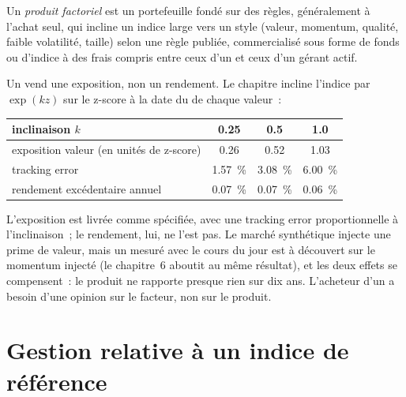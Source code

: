 \begin{definition}\label{def:s1:the-asset-managers-strategies:factor}
Un \emph{produit factoriel} est un portefeuille fondé sur des règles, généralement à l'achat seul, qui incline un indice large vers un style (valeur, momentum,
qualité, faible volatilité, taille) selon une règle publiée, commercialisé sous forme de fonds ou d'indice à des frais compris entre ceux d'un  et ceux d'un gérant actif.
\end{definition}

Un  vend une exposition, non un rendement. Le chapitre incline l'indice par $\exp(kz)$ sur le z-score à la date du  de chaque valeur~:

\begin{center}
\small
\begin{tabular}{@{}lccc@{}}
\toprule
inclinaison $k$ & 0.25 & 0.5 & 1.0\\
\midrule
exposition valeur (en unités de z-score) & 0.26 & 0.52 & 1.03\\
tracking error & 1.57~\% & 3.08~\% & 6.00~\%\\
rendement excédentaire annuel & 0.07~\% & 0.07~\% & 0.06~\%\\
\bottomrule
\end{tabular}
\end{center}

L'exposition est livrée comme spécifiée, avec une tracking error proportionnelle à l'inclinaison~; le rendement, lui, ne l'est pas. Le marché synthétique injecte une prime de valeur,
mais un  mesuré avec le cours du jour est à découvert sur le momentum injecté (le chapitre~6 aboutit au même résultat), et les deux effets se compensent~: le produit ne rapporte presque
rien sur dix ans. L'acheteur d'un  a besoin d'une opinion sur le facteur, non sur le produit.

\section{Gestion relative à un indice de référence}

